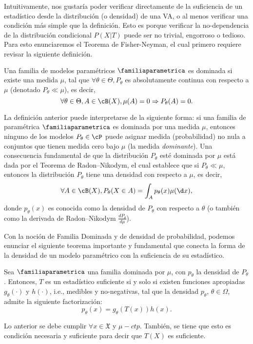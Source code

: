Intuitivamente, nos gustaría poder verificar directamente de la suficiencia de un estadístico desde la distribución (o densidad) de una VA, o al menos verificar una condición más simple que la definición. Esto es porque verificar la no-dependencia de la distribución condicional $P(X|T)$ puede ser no trivial, engorroso o tedioso. Para esto enunciaremos el Teorema de Fisher-Neyman, el cual primero requiere revisar la siguiente definición. 

\begin{definition}
	Una familia de modelos paramétricos $\familiaparametrica$ es dominada si existe una medida $\mu$, tal que $\forall \theta\in\Theta, P_\theta$ es absolutamente continua con respecto a $\mu$ (denotado $ P_\theta \ll \mu$), es decir, 
	\begin{equation}
	\nonumber
		\forall \theta\in\Theta, A\in\cB(X), \mu(A)=0 \Rightarrow P_\theta(A) = 0.
	\end{equation}
\end{definition}

La definición anterior puede interpretarse de la siguiente forma: si una familia de paramétrica $\familiaparametrica$ es dominada por una medida $\mu$, entonces ninguno de los modelos $P_\theta\in\cP$ puede asignar medida (probabilidad) no nula a conjuntos que tienen medida cero bajo $\mu$ (la medida \textit{dominante}). Una consecuencia fundamental de que la distribución $P_\theta$ esté dominada por $\mu$ está dada por el Teorema de Radon–Nikodym,  el cual establece que si $ P_\theta \ll \mu$, entonces la distribución $P_\theta$ tiene una densidad con respecto a $\mu$, es decir,	
	\begin{equation}
	\nonumber
		\forall A\in\cB(X), P_\theta(X\in A) = \int _A p_\theta(x) \mu(\d x),
	\end{equation}
donde $p_\theta(x)$ es conocida como la densidad de $P_\theta$ con respecto a $\theta$ (o también como la derivada de Radon–Nikodym  $\frac{d P_\theta}{d \mu}$).

Con la noción de Familia Dominada y de densidad de probabilidad, podemos enunciar el siguiente teorema importante y fundamental que conecta la forma de la densidad de un modelo paramétrico con la suficiencia de su estadístico. 

\begin{theorem}
	\label{teo:neyman-fisher}
	
	Sea $\familiaparametrica$  una familia dominada por $\mu$, con $p_\theta$ la densidad de $P_\theta$. Entonces, $T$ es un estadístico suficiente si y solo si existen funciones apropiadas $g_\theta(\cdot)$ y $h(\cdot)$, i.e., medibles y no-negativas, tal que la densidad $p_\theta$, $\theta\in\Omega$, admite la siguiente factorización: 
	\begin{equation}
		\label{eq:neyman-fisher}
		p_\theta (x) = g_\theta(T(x))h(x).
	\end{equation}

    Lo anterior se debe cumplir $\forall x\in\mathfrak{X}$ y $\mu-ctp$. También, se tiene que esto es condición necesaria y suficiente para decir que $T(X)$ es suficiente.
\end{theorem}

